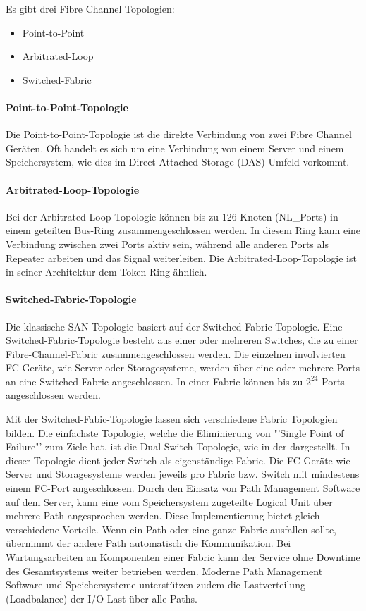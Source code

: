 Es gibt drei Fibre Channel Topologien:
\begin{itemize}
\item Point-to-Point
\item Arbitrated-Loop
\item Switched-Fabric
\end{itemize}

\paragraph*{Point-to-Point-Topologie}
Die Point-to-Point-Topologie ist die direkte Verbindung von zwei Fibre Channel Geräten. Oft handelt es sich um eine Verbindung von einem Server und einem Speichersystem, wie dies im Direct Attached Storage (DAS) Umfeld vorkommt. \cite{Christopher2009}

\paragraph*{Arbitrated-Loop-Topologie}
Bei der Arbitrated-Loop-Topologie können bis zu 126 Knoten (NL\_Ports) in einem geteilten Bus-Ring zusammengeschlossen werden. In diesem Ring kann eine Verbindung zwischen zwei Ports aktiv sein, während alle anderen Ports als Repeater arbeiten und das Signal weiterleiten. Die Arbitrated-Loop-Topologie ist in seiner Architektur dem Token-Ring ähnlich. \cite{Gupta2002}\cite{Christopher2009}

\paragraph*{Switched-Fabric-Topologie}
Die klassische SAN Topologie basiert auf der Switched-Fabric-Topologie. Eine Switched-Fabric-Topologie besteht aus einer oder mehreren Switches, die zu einer Fibre-Channel-Fabric zusammengeschlossen werden. Die einzelnen involvierten FC-Geräte, wie Server oder Storagesysteme, werden über eine oder mehrere Ports an eine Switched-Fabric angeschlossen. In einer Fabric können bis zu $2^{24}$ Ports angeschlossen werden. \cite{Gupta2002}\cite{Christopher2009}

Mit der Switched-Fabic-Topologie lassen sich verschiedene Fabric Topologien bilden.
Die einfachste Topologie, welche die Eliminierung von "'Single Point of Failure"' zum Ziele hat, ist die Dual Switch Topologie, wie in der  dargestellt. In dieser Topologie dient jeder Switch als eigenständige Fabric. Die FC-Geräte wie Server und Storagesysteme werden jeweils pro Fabric bzw. Switch mit mindestens einem FC-Port angeschlossen. Durch den Einsatz von Path Management Software auf dem Server, kann eine vom Speichersystem zugeteilte Logical Unit über mehrere Path angesprochen werden. Diese Implementierung bietet gleich verschiedene Vorteile. Wenn ein Path oder eine ganze Fabric ausfallen sollte, übernimmt der andere Path automatisch die Kommunikation. Bei Wartungsarbeiten an Komponenten einer Fabric kann der Service ohne Downtime des Gesamtsystems weiter betrieben werden. Moderne Path Management Software und Speichersysteme unterstützen zudem die Lastverteilung (Loadbalance) der I/O-Last über alle Paths. \cite{Christopher2009}

